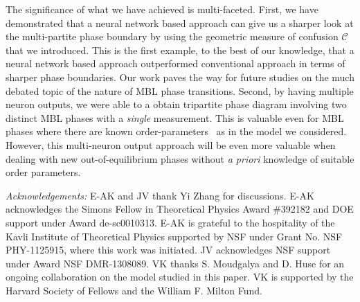 \documentclass[amsmath,amssymb, aps, prb, superscriptaddress,twocolumn]{revtex4-1}
\begin{document}
The significance of what we have achieved is multi-faceted. First, we have demonstrated that a neural network based approach can give us a sharper look at the multi-partite phase boundary by using the geometric measure of confusion $\mathcal{C}$ that we introduced. This is the first example, to the best of our knowledge, that a neural network based approach outperformed conventional approach in terms of sharper phase boundaries. Our work paves the way for future studies on the much debated topic of the nature of MBL phase transitions. Second, by having multiple neuron outputs, we were able to a obtain tripartite phase diagram involving two distinct MBL phases with a \emph{single} measurement. This is valuable even for MBL phases where there are known order-parameters~\cite{Kjall14} as in the model we considered. 
However, this multi-neuron output approach will be even more valuable when dealing with new out-of-equilibrium phases without \emph{a priori} knowledge of suitable order parameters. 

{\it Acknowledgements:} E-AK and JV thank Yi Zhang for discussions. 
 E-AK acknowledges the Simons Fellow
in Theoretical Physics Award \#392182 and DOE support
under Award de-sc0010313. E-AK is grateful to
the hospitality of the Kavli Institute of Theoretical Physics
supported by NSF under Grant No. NSF PHY-1125915,
where this work was initiated. JV acknowledges NSF support
 under Award NSF DMR-1308089.
VK thanks S. Moudgalya and D. Huse for an ongoing collaboration on the model studied in this paper. VK is supported by the Harvard Society of Fellows and the William F. Milton Fund. 


\end{document}
